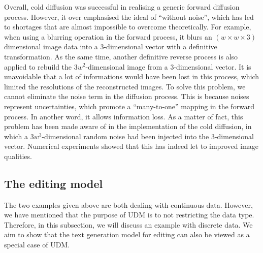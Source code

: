Overall, cold diffusion was successful in realising a generic forward diffusion process. However, it over emphasised the ideal of ``without noise'', which has led to shortages that are almost impossible to overcome theoretically. For example, when using a blurring operation in the forward process, it blurs an $(w\times w\times 3)$ dimensional image data into a 3-dimensional vector with a definitive transformation. As the same time, another definitive  reverse process is  also applied to rebuild the $3w^2$-dimensional image from a 3-dimensional vector. It is unavoidable that a lot of informations would have been lost in this process, which limited the resolutions of the reconstructed images. To solve this problem, we cannot eliminate the noise term in the diffusion process. This is because noises represent uncertainties, which promote a ``many-to-one'' mapping in the forward process. In another word, it allows information loss. As a matter of fact, this problem has been made aware of in the implementation of the cold diffusion, in which a $3w^3$-dimensional random noise had been injected into the 3-dimensional vector. Numerical experiments showed that this has indeed let to improved image qualities.

\subsection{The editing model}
The two examples given above are both dealing with continuous data. However, we have mentioned that the purpose of UDM is to not restricting the data type. Therefore, in this subsection, we will discuss an example with discrete data. We aim to show that the text generation model for editing can also be viewed as a special case of UDM.

